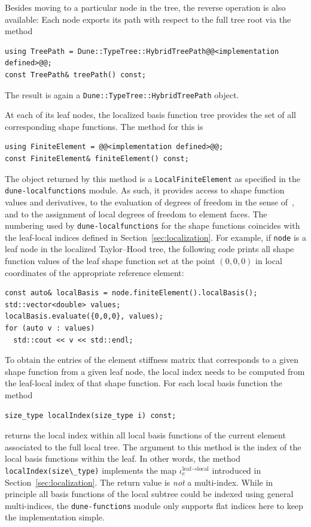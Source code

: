 \documentclass[a4paper,10pt,headings=normal,bibliography=totoc]{scrartcl}
\newcommand{\cpp}[1]{\lstinline[basicstyle=\ttfamily]!#1!}
\newcommand{\dunemodule}[1]{\texttt{#1}}
\begin{document}
Besides moving to a particular node in the tree, the reverse operation is also
available: Each node
exports its path with respect to the full tree root
via the  method
\begin{lstlisting}[style=Interface]
using TreePath = Dune::TypeTree::HybridTreePath@@<implementation defined>@@;
const TreePath& treePath() const;
\end{lstlisting}
The result is again a \cpp{Dune::TypeTree::HybridTreePath} object.

At each of its leaf nodes, the localized basis function tree provides the set
of all corresponding shape functions.
The method for this is
\begin{lstlisting}[style=Interface]
using FiniteElement = @@<implementation defined>@@;
const FiniteElement& finiteElement() const;
\end{lstlisting}
The object returned by this method is a \cpp{LocalFiniteElement} as specified
in the \dunemodule{dune-localfunctions} module. As such, it provides access
to shape function values and derivatives, to the evaluation of degrees of freedom
in the sense of~\cite{ciarlet:1978}, and to the assignment of local degrees of
freedom to element faces.
The numbering used by \dunemodule{dune-localfunctions} for the shape functions
coincides with the leaf-local indices defined in Section~\ref{sec:localization}.
For example, if \cpp{node} is a leaf node in the localized Taylor--Hood tree,
the following code prints all shape function values of the leaf shape function set
at the point $(0,0,0)$ in local coordinates of the appropriate reference element:
%
\begin{lstlisting}[style=Example]
const auto& localBasis = node.finiteElement().localBasis();
std::vector<double> values;
localBasis.evaluate({0,0,0}, values);
for (auto v : values)
  std::cout << v << std::endl;
\end{lstlisting}
%

To obtain the entries of the element stiffness matrix that corresponds to a
given shape function from a given leaf node, the local index needs to be computed
from the leaf-local index of that shape function.
For each local basis function the method
\begin{lstlisting}[style=Interface]
size_type localIndex(size_type i) const;
\end{lstlisting}
returns the
local index within all local basis functions of the current element associated to the full
local tree.
The argument to this method is the
index of the local basis functions within the leaf.
In other words, the method \cpp{localIndex(size\_type)}
implements the map $\iota^{\text{leaf}\to\text{local}}_e$
introduced in Section~\ref{sec:localization}.
The return value is \emph{not} a multi-index.
While in principle all basis functions of the local subtree could be indexed using
general multi-indices, the \dunemodule{dune-functions} module only supports
flat indices here to keep the implementation simple.
\end{document}
